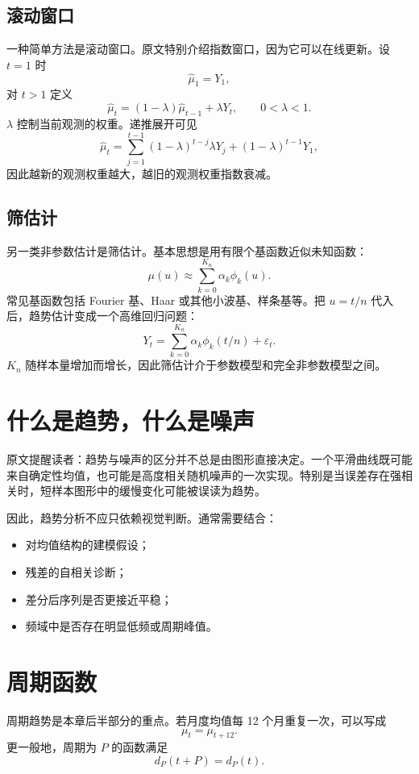 \documentclass[11pt,a4paper,openany]{ctexbook}
\begin{document}
\subsection{滚动窗口}

一种简单方法是滚动窗口。原文特别介绍指数窗口，因为它可以在线更新。设 \(t=1\) 时
\[
  \hat{\mu}_1=Y_1,
\]
对 \(t>1\) 定义
\[
  \hat{\mu}_t=(1-\lambda)\hat{\mu}_{t-1}+\lambda Y_t,
  \qquad 0<\lambda<1.
\]
\(\lambda\) 控制当前观测的权重。递推展开可见
\[
  \hat{\mu}_t
  =\sum_{j=1}^{t-1}(1-\lambda)^{t-j}\lambda Y_j+(1-\lambda)^{t-1}Y_1,
\]
因此越新的观测权重越大，越旧的观测权重指数衰减。

\subsection{筛估计}

另一类非参数估计是筛估计。基本思想是用有限个基函数近似未知函数：
\[
  \mu(u)\approx \sum_{k=0}^{K_n}\alpha_k\phi_k(u).
\]
常见基函数包括 Fourier 基、Haar 或其他小波基、样条基等。把 \(u=t/n\) 代入后，趋势估计变成一个高维回归问题：
\[
  Y_t=\sum_{k=0}^{K_n}\alpha_k\phi_k(t/n)+\varepsilon_t.
\]
\(K_n\) 随样本量增加而增长，因此筛估计介于参数模型和完全非参数模型之间。

\section{什么是趋势，什么是噪声}

原文提醒读者：趋势与噪声的区分并不总是由图形直接决定。一个平滑曲线既可能来自确定性均值，也可能是高度相关随机噪声的一次实现。特别是当误差存在强相关时，短样本图形中的缓慢变化可能被误读为趋势。

因此，趋势分析不应只依赖视觉判断。通常需要结合：
\begin{itemize}
  \item 对均值结构的建模假设；
  \item 残差的自相关诊断；
  \item 差分后序列是否更接近平稳；
  \item 频域中是否存在明显低频或周期峰值。
\end{itemize}

\section{周期函数}

周期趋势是本章后半部分的重点。若月度均值每 12 个月重复一次，可以写成
\[
  \mu_t=\mu_{t+12}.
\]
更一般地，周期为 \(P\) 的函数满足
\[
  d_P(t+P)=d_P(t).
\]
\end{document}
